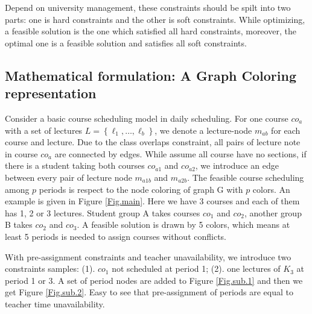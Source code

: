 \documentclass{article}
\begin{document}
Depend on university management, these constraints should be spilt into two parts: one is hard constraints and the other is soft constraints. While optimizing, a feasible solution is the one which satisfied all hard constraints, moreover, the optimal one is a feasible solution and satisfies all soft constraints.


\subsection{Mathematical formulation: A Graph Coloring representation}

Consider a basic course scheduling model in daily scheduling. For one course $co_a$ with a set of lectures $L=\left\{\ell_{1}, \ldots, \ell_{b}\right\}$, we denote a lecture-node $m_{ab}$ for each course and lecture. Due to the class overlaps constraint, all pairs of lecture note in course $co_a$ are connected by edges. While assume all course have no sections, if there is a student taking both courses $co_{a1}$ and $co_{a2}$, we introduce an edge between every pair of lecture node $m_{a1b}$ and $m_{a2b}$. The feasible course scheduling among $p$ periods is respect to the node coloring of graph G with $p$ colors. An example is given in Figure \ref{Fig.main}. Here we have 3 courses and each of them has 1, 2 or 3 lectures. Student group A takes courses $co_1$ and $co_2$, another group B takes $co_2$ and $co_3$. A feasible solution is drawn by 5 colors, which means at least 5 periods is needed to assign courses without conflicts.

With pre-assignment constraints and teacher unavailability, we introduce two constraints samples: (1). $co_{1}$ not scheduled at period 1; (2). one lectures of $K_{3}$ at period 1 or 3. A set of period nodes are added to Figure \ref{Fig.sub.1} and then we get Figure \ref{Fig.sub.2}. Easy to see that pre-assignment of periods are equal to teacher time unavailability.
\end{document}
